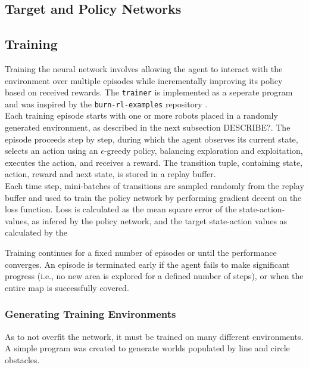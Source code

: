 \subsection{Target and Policy Networks}

\subsection{Training}
Training the neural network involves allowing the agent to interact with the environment over multiple episodes while incrementally improving its policy based on received rewards. The \texttt{trainer} is implemented as a seperate program and was inspired by the \texttt{burn-rl-examples} repository \cite{burn-rl-examples}. \\

Each training episode starts with one or more robots placed in a randomly generated environment, as described in the next subsection {\color{red}DESCRIBE?}. The episode proceeds step by step, during which the agent observes its current state, selects an action using an $\epsilon$-greedy policy, balancing exploration and exploitation, executes the action, and receives a reward. The transition tuple,  containing state, action, reward and next state, is stored in a replay buffer. \\

Each time step, mini-batches of transitions are sampled randomly from the replay buffer and used to train the policy network by performing gradient decent on the loss function. Loss is calculated as the mean square error of the state-action-values, as infered by the policy network, and the target state-action values as calculated by the 


Training continues for a fixed number of episodes or until the performance converges. An episode is terminated early if the agent fails to make significant progress (i.e., no new area is explored for a defined number of steps), or when the entire map is successfully covered.


\subsubsection{Generating Training Environments}
As to not overfit the network, it must be trained on many different environments. A simple program was created to generate worlds populated by line and circle obstacles.

